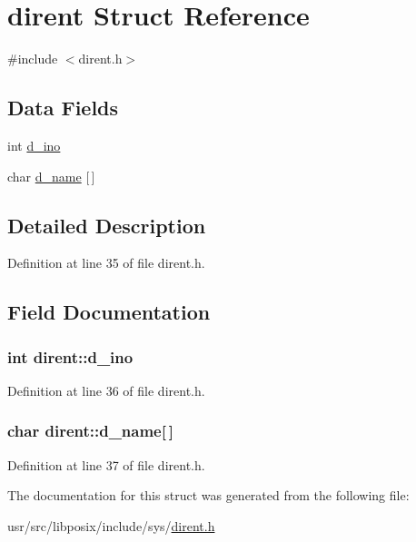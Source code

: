 \hypertarget{structdirent}{\section{dirent Struct Reference}
\label{structdirent}
}


{\ttfamily \#include $<$dirent.\+h$>$}

\subsection*{Data Fields}
\begin{DoxyCompactItemize}
\item 
int \hyperlink{structdirent_aef01e92a29cba347e6e6a5f22d4908a2}{d\+\_\+ino}
\item 
char \hyperlink{structdirent_a39a9af609c1808f0bdf90155bd3f55ed}{d\+\_\+name} \mbox{[}$\,$\mbox{]}
\end{DoxyCompactItemize}


\subsection{Detailed Description}


Definition at line 35 of file dirent.\+h.



\subsection{Field Documentation}
\hypertarget{structdirent_aef01e92a29cba347e6e6a5f22d4908a2}{
\subsubsection[{d\+\_\+ino}]{\setlength{\rightskip}{0pt plus 5cm}int dirent\+::d\+\_\+ino}}\label{structdirent_aef01e92a29cba347e6e6a5f22d4908a2}


Definition at line 36 of file dirent.\+h.

\hypertarget{structdirent_a39a9af609c1808f0bdf90155bd3f55ed}{
\subsubsection[{d\+\_\+name}]{\setlength{\rightskip}{0pt plus 5cm}char dirent\+::d\+\_\+name\mbox{[}$\,$\mbox{]}}}\label{structdirent_a39a9af609c1808f0bdf90155bd3f55ed}


Definition at line 37 of file dirent.\+h.



The documentation for this struct was generated from the following file\+:\begin{DoxyCompactItemize}
\item 
usr/src/libposix/include/sys/\hyperlink{dirent_8h}{dirent.\+h}\end{DoxyCompactItemize}
